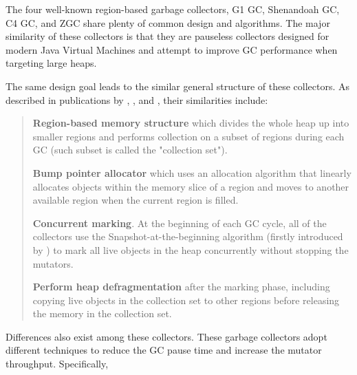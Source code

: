 The four well-known region-based garbage collectors, G1 GC, Shenandoah GC, C4 GC, and
ZGC share plenty of common design and algorithms. The major similarity of these collectors
is that they are pauseless collectors designed for modern Java Virtual
Machines and attempt to improve GC performance when targeting large heaps.

The same design goal leads to the similar general structure of these collectors.
As described in publications by \cite{detlefs2004garbage}, \cite{flood2016shenandoah},
\cite{tene2011c4} and \cite{liden_karlsson_2018}, their similarities include:

\begin{quote}
  \textbf{Region-based memory structure}
    which divides the whole heap up into smaller regions and performs collection
    on a subset of regions during each GC (such subset is called the "collection set").

  \textbf{Bump pointer allocator}
    which uses an allocation algorithm that linearly allocates objects within the memory
    slice of a region and moves to another available region when the current region is filled.

  \textbf{Concurrent marking}.
    At the beginning of each GC cycle, all of the collectors use the Snapshot-at-the-beginning algorithm
    (firstly introduced by \cite{yuasa1990real}) to mark all live objects in the heap
    concurrently without stopping the mutators.

  \textbf{Perform heap defragmentation}
    after the marking phase, including copying live objects in the collection set to other
    regions before releasing the memory in the collection set.
\end{quote}

Differences also exist among these collectors. These garbage collectors adopt
different techniques to reduce the GC pause time and increase the mutator throughput.
Specifically,

